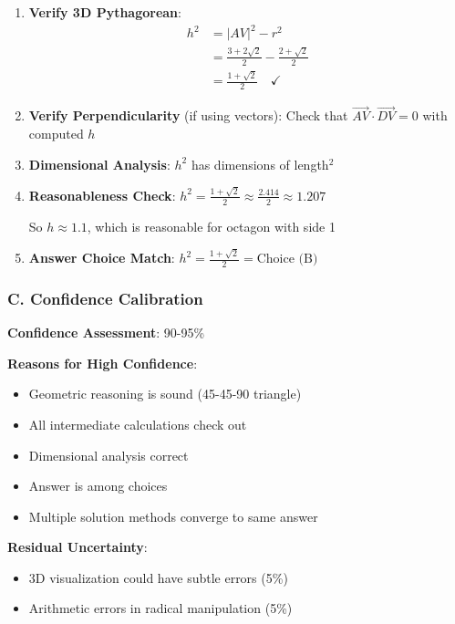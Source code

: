 \documentclass[12pt]{article}
\begin{document}
\begin{verificationbox}
\begin{enumerate}
    \item \textbf{Verify 3D Pythagorean}:
    \begin{align*}
    h^2 &= |AV|^2 - r^2 \\
    &= \frac{3+2\sqrt{2}}{2} - \frac{2+\sqrt{2}}{2} \\
    &= \frac{1+\sqrt{2}}{2} \quad \checkmark
    \end{align*}
    
    \item \textbf{Verify Perpendicularity} (if using vectors):
    Check that $\vec{AV} \cdot \vec{DV} = 0$ with computed $h$
    
    \item \textbf{Dimensional Analysis}:
    $h^2$ has dimensions of length$^2$ \checkmark
    
    \item \textbf{Reasonableness Check}:
    $h^2 = \frac{1+\sqrt{2}}{2} \approx \frac{2.414}{2} \approx 1.207$
    
    So $h \approx 1.1$, which is reasonable for octagon with side 1
    
    \item \textbf{Answer Choice Match}:
    $h^2 = \frac{1+\sqrt{2}}{2} = \text{Choice (B)}$ \quad \checkmark
\end{enumerate}

\subsubsection*{C. Confidence Calibration}

\textbf{Confidence Assessment}: 90-95\%

\textbf{Reasons for High Confidence}:
\begin{itemize}
    \item Geometric reasoning is sound (45-45-90 triangle)
    \item All intermediate calculations check out
    \item Dimensional analysis correct
    \item Answer is among choices
    \item Multiple solution methods converge to same answer
\end{itemize}

\textbf{Residual Uncertainty}:
\begin{itemize}
    \item 3D visualization could have subtle errors (5\%)
    \item Arithmetic errors in radical manipulation (5\%)
\end{itemize}

\end{verificationbox}
\end{document}

